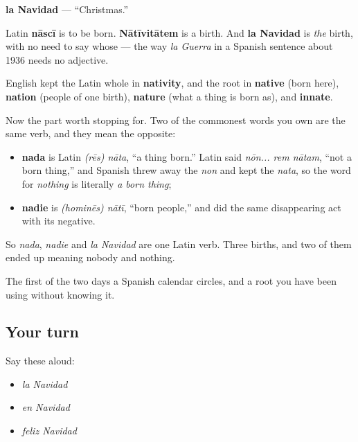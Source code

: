 \begin{cousinweb}
\textbf{la Navidad} — \textquotedblleft{}Christmas.\textquotedblright{}

Latin \textbf{nāscī} is to be born. \textbf{Nātīvitātem} is a birth. And \textbf{la Navidad} is \emph{the} birth, with no need to say whose — the way \emph{la Guerra} in a Spanish sentence about 1936 needs no adjective.

English kept the Latin whole in \textbf{nativity}, and the root in \textbf{native} (born here), \textbf{nation} (people of one birth), \textbf{nature} (what a thing is born as), and \textbf{innate}.

Now the part worth stopping for. Two of the commonest words you own are the same verb, and they mean the opposite:

\begin{itemize}
\raggedright
  \item \textbf{nada} is Latin \emph{(rēs) nāta}, \textquotedblleft{}a thing born.\textquotedblright{} Latin said \emph{nōn... rem nātam}, \textquotedblleft{}not a born thing,\textquotedblright{} and Spanish threw away the \emph{non} and kept the \emph{nata}, so the word for \emph{nothing} is literally \emph{a born thing};
  \item \textbf{nadie} is \emph{(hominēs) nātī}, \textquotedblleft{}born people,\textquotedblright{} and did the same disappearing act with its negative.
\end{itemize}

So \emph{nada}, \emph{nadie} and \emph{la Navidad} are one Latin verb. Three births, and two of them ended up meaning nobody and nothing.
\end{cousinweb}

\begin{grammarlens}[title={What you've built}]
The first of the two days a Spanish calendar circles, and a root you have been using without knowing it.
\end{grammarlens}

\subsection*{Your turn}
Say these aloud:

\begin{itemize}
\raggedright
  \item \emph{la Navidad}
  \item \emph{en Navidad}
  \item \emph{feliz Navidad}
\end{itemize}

